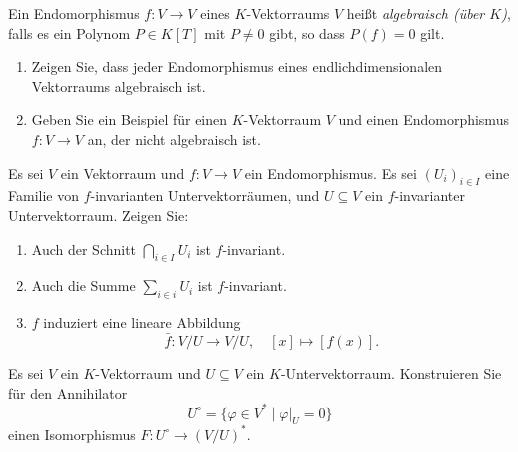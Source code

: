 \documentclass[a4paper,10pt]{scrartcl}
\begin{document}
\begin{question}
  Ein Endomorphismus $f \colon V \to V$ eines $K$-Vektorraums $V$ heißt \emph{algebraisch (über $K$)}, falls es ein Polynom $P \in K[T]$ mit $P \neq 0$ gibt, so dass $P(f) = 0$ gilt.
  \begin{enumerate}[leftmargin=*]
    \item
      Zeigen Sie, dass jeder Endomorphismus eines endlichdimensionalen Vektorraums algebraisch ist.
    \item
      Geben Sie ein Beispiel für einen $K$-Vektorraum $V$ und einen Endomorphismus $f \colon V \to V$ an, der nicht algebraisch ist.
  \end{enumerate}
\end{question}












\begin{question}
  Es sei $V$ ein Vektorraum und $f \colon V \to V$ ein Endomorphismus.
  Es sei $(U_i)_{i \in I}$ eine Familie von $f$-invarianten Untervektorräumen, und $U \subseteq V$ ein $f$-invarianter Untervektorraum.
  Zeigen Sie:
  \begin{enumerate}[leftmargin=*]
    \item
      Auch der Schnitt $\bigcap_{i \in I} U_i$ ist $f$-invariant.
    \item
      Auch die Summe $\sum_{i \in i} U_i$ ist $f$-invariant.
    \item
      $f$ induziert eine lineare Abbildung
      \[
        \bar{f} \colon V/U \to V/U,
        \quad
        [x] \mapsto [f(x)].
      \]
  \end{enumerate}
\end{question}


\begin{question}
  Es sei $V$ ein $K$-Vektorraum und $U \subseteq V$ ein $K$-Untervektorraum.
  Konstruieren Sie für den Annihilator
  \[
      U^\circ
    = \{ \varphi \in V^* \mid \varphi|_U = 0 \}
  \]
  einen Isomorphismus $F \colon U^\circ \to (V/U)^*$.
\end{question}
\end{document}
